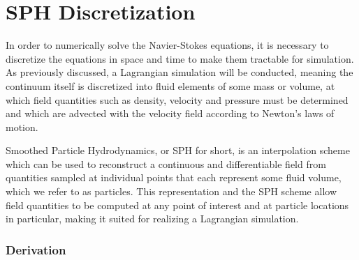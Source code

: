 \documentclass[oneside, a4paper]{book}
\newcommand\vek[1]{\vec{\bm{#1}}}
\begin{document}

    \newpage\section{SPH Discretization}\label{sec:sph-discretization}
    In order to numerically solve the Navier-Stokes equations, it is necessary to discretize the equations in space and time to make them tractable for simulation. As previously discussed, a Lagrangian simulation will be conducted, meaning the continuum itself is discretized into fluid elements of some mass or volume, at which field quantities such as density, velocity and pressure must be determined and which are advected with the velocity field according to Newton's laws of motion. 
    
    Smoothed Particle Hydrodynamics, or SPH for short, is an interpolation scheme which can be used to reconstruct a continuous and differentiable field from quantities sampled at individual points that each represent some fluid volume, which we refer to as particles. This representation and the SPH scheme allow field quantities to be computed at any point of interest and at particle locations in particular, making it suited for realizing a Lagrangian simulation.

    \subsubsection{Derivation}
\end{document}
